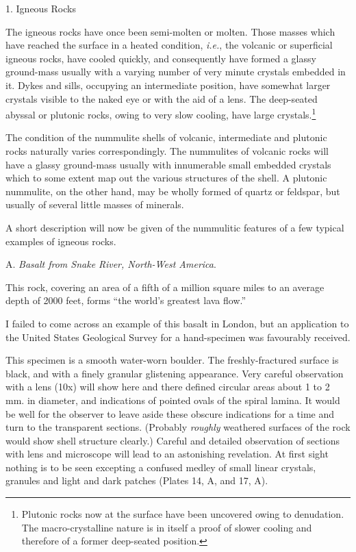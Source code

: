 \documentclass[a4paper, 12pt, oneside]{article}
\begin{document}
1. Igneous Rocks

The igneous rocks have once been semi-molten or molten. Those masses which have reached the surface in a heated condition, \emph{i.e.}, the volcanic or superficial igneous rocks, have cooled quickly, and consequently have formed a glassy ground-mass usually with a varying number of very minute crystals embedded in it. Dykes and sills, occupying an intermediate position, have somewhat larger crystals visible to the naked eye or with the aid of a lens. The deep-seated abyssal or plutonic rocks, owing to very slow cooling, have large crystals.\footnote{Plutonic rocks now at the surface have been uncovered owing to denudation. The macro-crystalline nature is in itself a proof of slower cooling and therefore of a former deep-seated position.}

The condition of the nummulite shells of volcanic, intermediate and plutonic rocks naturally varies correspondingly. The nummulites of volcanic rocks will have a glassy ground-mass usually with innumerable small embedded crystals which to some extent map out the various structures of the shell. A plutonic nummulite, on the other hand, may be wholly formed of quartz or feldspar, but usually of several little masses of minerals.

A short description will now be given of the nummulitic features of a few typical examples of igneous rocks.

A. \emph{Basalt from Snake River, North-West America}.

This rock, covering an area of a fifth of a million square miles to an average depth of 2000 feet, forms ``the world's greatest lava flow.''

I failed to come across an example of this basalt in London, but an application to the United States Geological Survey for a hand-specimen was favourably received.

This specimen is a smooth water-worn boulder. The freshly-fractured surface is black, and with a finely granular glistening appearance. Very careful observation with a lens (10x) will show here and there defined circular areas about 1 to 2 mm. in diameter, and indications of pointed ovals of the spiral lamina. It would be well for the observer to leave aside these obscure indications for a time and turn to the transparent sections. (Probably \emph{roughly} weathered surfaces of the rock would show shell structure clearly.) Careful and detailed observation of sections with lens and microscope will lead to an astonishing revelation. At first sight nothing is to be seen excepting a confused medley of small linear crystals, granules and light and dark patches (Plates 14, A, and 17, A).
\end{document}
